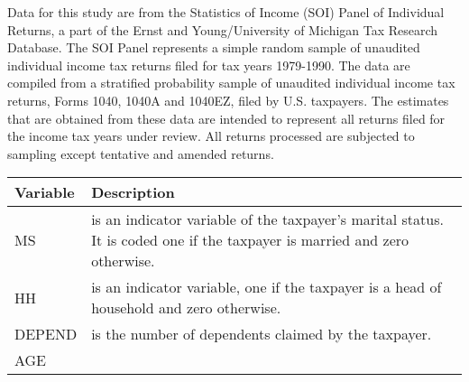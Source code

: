 \documentclass[]{book}
\begin{document}
Data for this study are from the Statistics of Income (SOI) Panel of Individual Returns, a part of the Ernst and Young/University of Michigan Tax Research Database. The SOI Panel represents a simple random sample of unaudited individual income tax returns filed for tax years 1979-1990. The data are compiled from a stratified probability sample of unaudited individual income tax returns, Forms 1040, 1040A and 1040EZ, filed by U.S. taxpayers. The estimates that are obtained from these data are intended to represent all returns filed for the income tax years under review. All returns processed are subjected to sampling except tentative and amended returns.

\begin{longtable}[]{@{}ll@{}}
\toprule
\begin{minipage}[b]{0.06\columnwidth}\raggedright
Variable\strut
\end{minipage} & \begin{minipage}[b]{0.88\columnwidth}\raggedright
Description\strut
\end{minipage}\tabularnewline
\midrule
\endhead
\begin{minipage}[t]{0.06\columnwidth}\raggedright
MS\strut
\end{minipage} & \begin{minipage}[t]{0.88\columnwidth}\raggedright
is an indicator variable of the taxpayer's marital status. It is coded one if the taxpayer is married and zero otherwise.\strut
\end{minipage}\tabularnewline
\begin{minipage}[t]{0.06\columnwidth}\raggedright
HH\strut
\end{minipage} & \begin{minipage}[t]{0.88\columnwidth}\raggedright
is an indicator variable, one if the taxpayer is a head of household and zero otherwise.\strut
\end{minipage}\tabularnewline
\begin{minipage}[t]{0.06\columnwidth}\raggedright
DEPEND\strut
\end{minipage} & \begin{minipage}[t]{0.88\columnwidth}\raggedright
is the number of dependents claimed by the taxpayer.\strut
\end{minipage}\tabularnewline
\begin{minipage}[t]{0.06\columnwidth}\raggedright
AGE\strut
\end{minipage} & \begin{minipage}[t]{0.88\columnwidth}\raggedright

\end{minipage}
\end{longtable}
\end{document}
